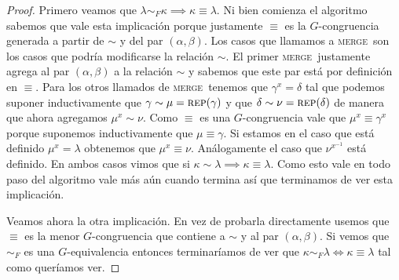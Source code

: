 \documentclass[tesis.tex]{subfiles}
\newcommand{\rep}{\textsc{rep}}
\newcommand{\mer}{\textsc{merge}}
\begin{document}
\begin{proof}
     Primero veamos que $\lambda \sim_F \kappa \implies \kappa \equiv \lambda$.
     Ni bien comienza el algoritmo sabemos que vale esta implicación porque justamente $\equiv$ es la $G$-congruencia generada a partir de $\sim$ y del par $(\alpha, \beta)$.
     Los casos que llamamos a \mer \ son los casos que podría modificarse la relación $\sim$.
     El primer \mer \ justamente agrega al par $(\alpha, \beta)$ a la relación $\sim$ y sabemos que este par está por definición en $\equiv$. 
     Para los otros llamados de \mer \ tenemos que $\gamma^x = \delta$ tal que podemos suponer inductivamente que $\gamma \sim \mu = \rep(\gamma)$ y que $\delta \sim \nu = \rep (\delta)$ de manera que ahora agregamos $\mu^x \sim \nu$.
     Como $\equiv$ es una $G$-congruencia vale que $\mu^x \equiv \gamma^x$ porque suponemos inductivamente que $\mu \equiv \gamma$.
     Si estamos en el caso que está definido $\mu^x=\lambda$  obtenemos que $\mu^x \equiv \nu$. 
     Análogamente el caso que $\nu^{x^{-1}}$ está definido. 
     En ambos casos vimos que si $\kappa \sim \lambda \implies \kappa \equiv \lambda$. 
     Como esto vale en todo paso del algoritmo vale más aún cuando termina así que terminamos de ver esta implicación.

     
%    
    Veamos ahora la otra implicación. 
    En vez de probarla directamente usemos que $\equiv$ es la menor $G$-congruencia que contiene a $\sim$ y al par $(\alpha, \beta)$. 
    Si vemos que $\sim_F$ es una $G$-equivalencia entonces terminaríamos de ver que $\kappa \sim_F \lambda \iff \kappa \equiv \lambda$ tal como queríamos ver.
       

\end{proof}
\end{document}
